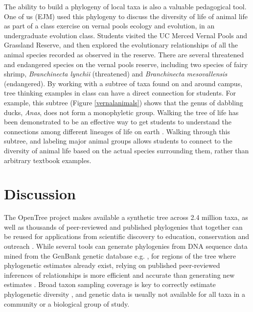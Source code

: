 \documentclass[oupdraft]{sysbio_sse}
\begin{document}
The ability to build a phylogeny of local taxa is also a valuable pedagogical tool. One of us (EJM) used this phylogeny to discuss the diversity of life of animal life as part of a class exercise on vernal pools ecology and evolution, in an undergraduate evolution class.
Students visited the UC Merced Vernal Pools and Grassland Reserve, and then explored the evolutionary relationships of all the animal species recorded as observed in the reserve.
There are several threatened and endangered species on the vernal pools reserve, including two species of fairy shrimp, \textit{Branchinecta lynchii} (threatened) and \textit{Branchinecta mesovallensis} (endangered).
By working with a subtree of taxa found on and around campus, tree thinking examples in class can have a direct connection for students. For example, this subtree (Figure \ref{vernalanimals}) shows that the genus of dabbling ducks, \textit{Anas}, does not form a monophyletic group. Walking the tree of life has been demonstrated to be an effective way to get students to understand the connections among different lineages of life on earth \citep{ballen_walking_2017}. Walking through this subtree, and labeling major animal groups allows students to connect to the diversity of animal life based on the actual species surrounding them, rather than arbitrary textbook examples.

\bigskip
\section{Discussion}
\label{sec5}

The OpenTree project makes available a synthetic tree across 2.4 million taxa, as well as thousands of peer-reviewed and published phylogenies that together can be reused for applications
from scientific discovery to education, conservation and
outreach \citep{stoltzfus2013phylotastic, mctavish_phylesystem_2015, rosindell2012onezoom, wong2020dynamic}.
While several tools can generate phylogenies from DNA sequence data mined from the GenBank genetic database e.g. \citep{smith2009mega, sanderson2008phylota, antonelli2014supersmart, reyes_physcraper_2020}, for regions of the tree where phylogenetic estimates already exist, relying on published peer-reviewed inferences of relationships is more efficient and accurate than generating new estimates \citep{smith2018constructing, owen2015synthetic, brown2017development, ewers2019towards}.
Broad taxon sampling coverage is key to correctly estimate phylogenetic
diversity \citep{jantzen2019effects, park2018taxon}, and genetic data is usually not available for all taxa in a community or a biological group of study.
\end{document}
